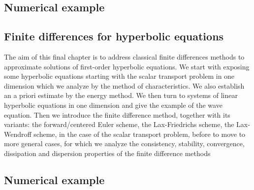\documentclass{article}
\begin{document}
\subsection{Numerical example}

\subsection{Finite differences for hyperbolic equations}

The aim of this final chapter is to address classical finite differences
methods to  approximate solutions of first-order hyperbolic equations. We
start with exposing some hyperbolic equations starting with the scalar
transport problem in one dimension which we analyze by the method of
characteristics. We also establish an a priori estimate by the energy method.
We then turn to systems of linear hyperbolic equations in one dimension and
give the example of  the wave equation. Then we introduce the finite
difference method, together with its variants: the forward/centered Euler
scheme, the Lax-Friedrichs scheme, the Lax-Wendroff scheme, in the case of the
scalar transport problem, before to move to more general cases, for which we
analyze the consistency, stability, convergence, dissipation and dispersion
properties of the finite difference methods 

\subsection{Numerical example}


\printbibliography
\end{document}
